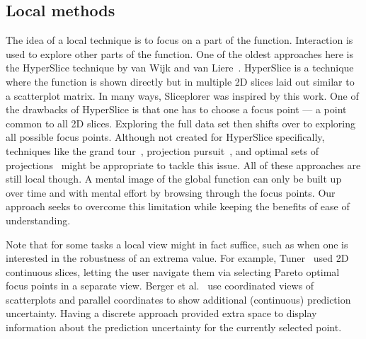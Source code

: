 
\subsection{Local methods}

The idea of a local technique is to focus on a part of the function.
Interaction is used to explore other parts of the function. One of the oldest
approaches here is the HyperSlice technique by van Wijk and van
Liere~\cite{Wijk:1993}.  HyperSlice is a technique where the function is shown
directly but in multiple 2D slices laid out similar to a scatterplot matrix. In
many ways, Sliceplorer was inspired by this work. One of the drawbacks of
HyperSlice is that one has to choose a focus point --- a point common to all 2D
slices. Exploring the full data set then shifts over to exploring all possible
focus points. Although not created for HyperSlice specifically,  techniques
like the grand tour~\cite{Asimov:1985}, projection pursuit~\cite{Huber:1985},
and optimal sets of projections~\cite{Lehmann:2015b} might be appropriate to
tackle this issue.
All of these approaches are
still local though. A mental image of the global function can only be built up
over time and with mental effort by browsing through the focus points. Our
approach seeks to overcome this limitation while keeping the benefits of ease
of understanding.  

Note that for some tasks a local view might in fact suffice, such as when one is interested in the robustness of an extrema value. 
For example, Tuner~\cite{Torsney-Weir:2011} used 2D
continuous slices, letting the user navigate them via selecting Pareto optimal focus points in a separate view. 
Berger et
al.~\cite{Berger:2011} use coordinated views of
scatterplots and parallel coordinates to show additional (continuous) prediction uncertainty. Having a discrete approach provided extra space to display information about the prediction uncertainty for the currently selected point.

